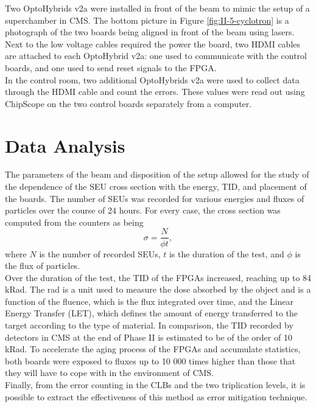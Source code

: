     Two OptoHybrids v2a were installed in front of the beam to mimic the setup of a superchamber in CMS. The bottom picture in Figure \ref{fig:II-5-cyclotron} is a photograph of the two boards being aligned in front of the beam using lasers. Next to the low voltage cables required the power the board, two HDMI cables are attached to each OptoHybrid v2a: one used to communicate with the control boards, and one used to send reset signals to the FPGA. \\

    In the control room, two additional OptoHybrids v2a were used to collect data through the HDMI cable and count the errors. These values were read out using ChipScope on the two control boards separately from a computer.

  \section{Data Analysis}

    The parameters of the beam and disposition of the setup allowed for the study of the dependence of the SEU cross section with the energy, TID, and placement of the boards. The number of SEUs was recorded for various energies and fluxes of particles over the course of 24 hours. For every case, the cross section was computed from the counters as being
    \begin{equation}
        \sigma = \frac{N}{\phi t} ,
    \end{equation}
    where $ N $ is the number of recorded SEUs, $ t $ is the duration of the test, and $ \phi $ is the flux of particles. \\

    Over the duration of the test, the TID of the FPGAs increased, reaching up to 84 kRad. The rad is a unit used to measure the dose absorbed by the object and is a function of the fluence, which is the flux integrated over time, and the Linear Energy Transfer (LET), which defines the amount of energy transferred to the target according to the type of material. In comparison, the TID recorded by detectors in CMS at the end of Phase II is estimated to be of the order of 10 kRad. To accelerate the aging process of the FPGAs and accumulate statistics, both boards were exposed to fluxes up to 10 000 times higher than those that they will have to cope with in the environment of CMS. \\

    Finally, from the error counting in the CLBs and the two triplication levels, it is possible to extract the effectiveness of this method as error mitigation technique.

